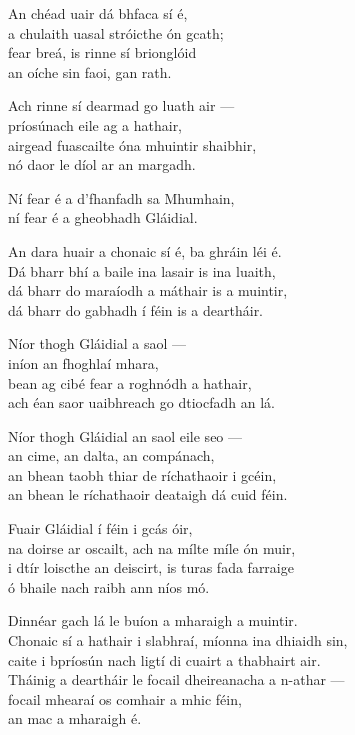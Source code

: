 \begin{lyrics}
An chéad uair dá bhfaca sí é,\\
a chulaith uasal stróicthe ón gcath;\\
fear breá, is rinne sí brionglóid\\
an oíche sin faoi, gan rath.

Ach rinne sí dearmad go luath air —\\
príosúnach eile ag a hathair,\\
airgead fuascailte óna mhuintir shaibhir,\\
nó daor le díol ar an margadh.

Ní fear é a d'fhanfadh sa Mhumhain,\\
ní fear é a gheobhadh Gláidial.

An dara huair a chonaic sí é, ba ghráin léi é.\\
Dá bharr bhí a baile ina lasair is ina luaith,\\
dá bharr do maraíodh a máthair is a muintir,\\
dá bharr do gabhadh í féin is a deartháir.

Níor thogh Gláidial a saol —\\
iníon an fhoghlaí mhara,\\
bean ag cibé fear a roghnódh a hathair,\\
ach éan saor uaibhreach go dtiocfadh an lá.

Níor thogh Gláidial an saol eile seo —\\
an cime, an dalta, an compánach,\\
an bhean taobh thiar de ríchathaoir i gcéin,\\
an bhean le ríchathaoir deataigh dá cuid féin.

Fuair Gláidial í féin i gcás óir,\\
na doirse ar oscailt, ach na mílte míle ón muir,\\
i dtír loiscthe an deiscirt, is turas fada farraige\\
ó bhaile nach raibh ann níos mó.

Dinnéar gach lá le buíon a mharaigh a muintir.\\
Chonaic sí a hathair i slabhraí, míonna ina dhiaidh sin,\\
caite i bpríosún nach ligtí di cuairt a thabhairt air.\\
Tháinig a deartháir le focail dheireanacha a n-athar —\\
focail mhearaí os comhair a mhic féin,\\
an mac a mharaigh é.


\end{lyrics}
